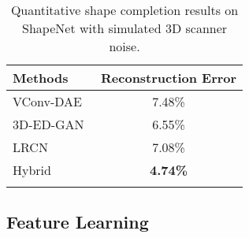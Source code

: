 \documentclass[10pt,twocolumn,letterpaper]{article}
\begin{document}



\begin{table}
\begin{center}
\setlength{\tabcolsep}{0.1em}
\begin{tabular}{lc}
\Xhline{3\arrayrulewidth}
Methods&Reconstruction Error\\
\hline
VConv-DAE~\cite{vconvdae} & 7.48\% \\
3D-ED-GAN & 6.55\% \\
LRCN & 7.08\%\\
Hybrid&\textbf{4.74\%}\\
\Xhline{3\arrayrulewidth}
\end{tabular}
\end{center}
\caption{Quantitative shape completion results on ShapeNet with simulated 3D scanner noise.}
\label{table:completionhigh}
\end{table}

\subsection{Feature Learning}
\label{sec:featurelearning}
\end{document}
